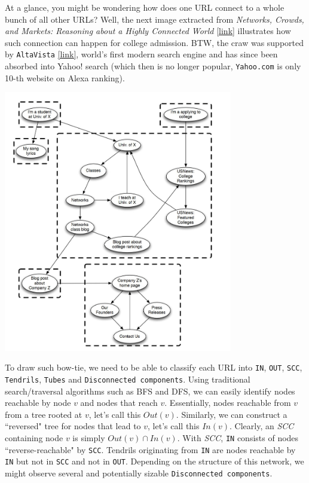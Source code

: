 At a glance, you might be wondering how does one URL connect to a whole bunch of all other URLs? Well, the next image extracted from \textit{Networks, Crowds, and Markets: Reasoning about a Highly Connected World} \href{https://www.cs.cornell.edu/home/kleinber/networks-book/networks-book-ch13.pdf}{[link]} illustrates how such connection can happen for college admission. BTW, the craw was supported by \texttt{AltaVista} \href{https://en.wikipedia.org/wiki/AltaVista}{[link]}, world's first modern search engine and has since been absorbed into Yahoo! search (which then is no longer popular, \texttt{Yahoo.com} is only 10-th website on Alexa ranking).

{
\centering
\includegraphics[width=0.75\textwidth]{notes/img/n3_scc_2.JPG} \par
}


To draw such bow-tie, we need to be able to classify each URL into \texttt{IN}, \texttt{OUT}, \texttt{SCC}, \texttt{Tendrils}, \texttt{Tubes} and \texttt{Disconnected components}. Using traditional search/traversal algorithms such as BFS and DFS, we can easily identify nodes reachable by node $v$ and nodes that reach $v$. Essentially, nodes reachable from $v$ from a tree rooted at $v$, let's call this $Out(v)$. Similarly, we can construct a ``reversed" tree for nodes that lead to $v$, let's call this $In(v)$. Clearly, an \textit{SCC} containing node $v$ is simply $Out(v) \cap In(v)$. With \textit{SCC}, \texttt{IN} consists of nodes ``reverse-reachable" by \texttt{SCC}. Tendrils originating from \texttt{IN} are nodes reachable by \texttt{IN} but not in \texttt{SCC} and not in \texttt{OUT}. Depending on the structure of this network, we might observe several and potentially sizable \texttt{Disconnected components}. 


